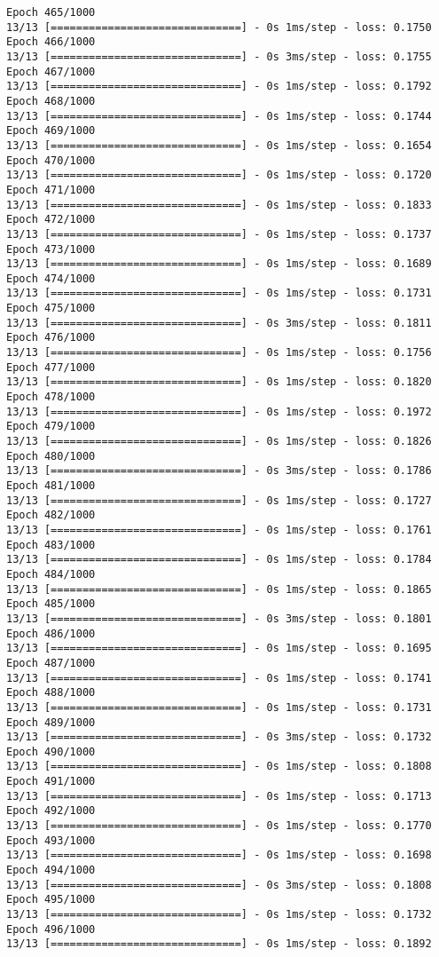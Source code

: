 \documentclass[11pt]{article}
\begin{document}
\begin{Verbatim}[commandchars=\\\{\}]
Epoch 465/1000
13/13 [==============================] - 0s 1ms/step - loss: 0.1750
Epoch 466/1000
13/13 [==============================] - 0s 3ms/step - loss: 0.1755
Epoch 467/1000
13/13 [==============================] - 0s 1ms/step - loss: 0.1792
Epoch 468/1000
13/13 [==============================] - 0s 1ms/step - loss: 0.1744
Epoch 469/1000
13/13 [==============================] - 0s 1ms/step - loss: 0.1654
Epoch 470/1000
13/13 [==============================] - 0s 1ms/step - loss: 0.1720
Epoch 471/1000
13/13 [==============================] - 0s 1ms/step - loss: 0.1833
Epoch 472/1000
13/13 [==============================] - 0s 1ms/step - loss: 0.1737
Epoch 473/1000
13/13 [==============================] - 0s 1ms/step - loss: 0.1689
Epoch 474/1000
13/13 [==============================] - 0s 1ms/step - loss: 0.1731
Epoch 475/1000
13/13 [==============================] - 0s 3ms/step - loss: 0.1811
Epoch 476/1000
13/13 [==============================] - 0s 1ms/step - loss: 0.1756
Epoch 477/1000
13/13 [==============================] - 0s 1ms/step - loss: 0.1820
Epoch 478/1000
13/13 [==============================] - 0s 1ms/step - loss: 0.1972
Epoch 479/1000
13/13 [==============================] - 0s 1ms/step - loss: 0.1826
Epoch 480/1000
13/13 [==============================] - 0s 3ms/step - loss: 0.1786
Epoch 481/1000
13/13 [==============================] - 0s 1ms/step - loss: 0.1727
Epoch 482/1000
13/13 [==============================] - 0s 1ms/step - loss: 0.1761
Epoch 483/1000
13/13 [==============================] - 0s 1ms/step - loss: 0.1784
Epoch 484/1000
13/13 [==============================] - 0s 1ms/step - loss: 0.1865
Epoch 485/1000
13/13 [==============================] - 0s 3ms/step - loss: 0.1801
Epoch 486/1000
13/13 [==============================] - 0s 1ms/step - loss: 0.1695
Epoch 487/1000
13/13 [==============================] - 0s 1ms/step - loss: 0.1741
Epoch 488/1000
13/13 [==============================] - 0s 1ms/step - loss: 0.1731
Epoch 489/1000
13/13 [==============================] - 0s 3ms/step - loss: 0.1732
Epoch 490/1000
13/13 [==============================] - 0s 1ms/step - loss: 0.1808
Epoch 491/1000
13/13 [==============================] - 0s 1ms/step - loss: 0.1713
Epoch 492/1000
13/13 [==============================] - 0s 1ms/step - loss: 0.1770
Epoch 493/1000
13/13 [==============================] - 0s 1ms/step - loss: 0.1698
Epoch 494/1000
13/13 [==============================] - 0s 3ms/step - loss: 0.1808
Epoch 495/1000
13/13 [==============================] - 0s 1ms/step - loss: 0.1732
Epoch 496/1000
13/13 [==============================] - 0s 1ms/step - loss: 0.1892

\end{Verbatim}
\end{document}
